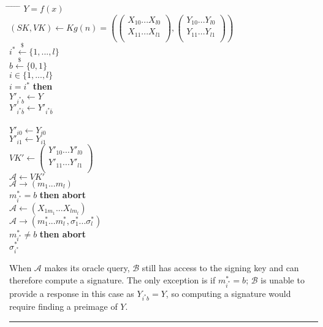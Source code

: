 \documentclass[twoside]{article}
\newenvironment{proof}{{\bf Proof:}}{\hfill\rule{2mm}{2mm}}
\begin{document}
\begin{proof}
\begin{tabbing}
\hspace*{.25in} \= \hspace*{.25in} \= \hspace*{.25in} \= \hspace*{.25in} \= \hspace*{.25in} \=\kill
{} $Y = f(x)$\\
\>$(SK, VK) \leftarrow Kg(n) = \left(
\begin{pmatrix}
X_{10}...X_{l0}\\
X_{11}...X_{l1}\\
\end{pmatrix},
\begin{pmatrix}
Y_{10}...Y_{l0}\\
Y_{11}...Y_{l1}\\
\end{pmatrix}\right)$\\
\>$i^* \xleftarrow{\$} \{1,...,l\} $\\
\>$b \xleftarrow{\$} \{0,1\}$\\
 $i \in \{1,...,l\}$\\
\> $i = i^*$ {\bf then}\\
\>\>\>$Y'_{i^*b} \leftarrow Y$\\
\>\>\>$Y'_{i^*\bar{b}} \leftarrow Y'_{i^*\bar{b}}$\\
\>\\
\>\>\>$Y'_{i0} \leftarrow Y_{i0}$\\
\>\>\>$Y'_{i1} \leftarrow Y_{i1}$\\
\>$VK' \leftarrow
\begin{pmatrix}
Y'_{10}...Y'_{l0}\\
Y'_{11}...Y'_{l1}\\
\end{pmatrix}$\\
\>$\mathcal{A} \leftarrow VK'$\\
\>$\mathcal{A} \rightarrow (m_1...m_l)$\\
 $m^*_{i^*} = b$ {\bf then abort}\\
\>$\mathcal{A} \leftarrow (X_{1m_1}...X_{lm_l})$\\
\>$\mathcal{A} \rightarrow (m^*_1...m^*_l,\sigma^*_1...\sigma^*_l)$\\
 $m^*_{i^*} \neq b$ {\bf then abort}\\
 $\sigma^*_{i^*}$
\end{tabbing}

When $\mathcal{A}$ makes its oracle query, $\mathcal{B}$ still has access to the signing key and can therefore compute a signature. The only exception is if $m^*_{i^*} = b$; $\mathcal{B}$ is unable to provide a response in this case as $Y_{i^*b} = Y$, so computing a signature would require finding a preimage of $Y$.


\end{proof}
\end{document}
